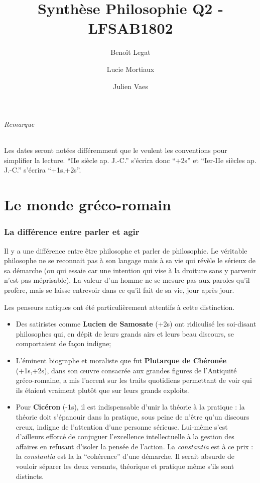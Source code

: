 \documentclass[11pt,a4paper]{article} %
\title{Synthèse Philosophie Q2 - LFSAB1802}
\author{Benoît Legat \and Lucie Mortiaux \and Julien Vaes}
\begin{document}
\maketitle

\paragraph{Remarque}
Les dates seront notées différemment que le veulent les conventions pour simplifier la lecture.
``IIe siècle ap. J.-C.'' s'écrira donc ``+2s'' et
``Ier-IIe siècles ap. J.-C.'' s'écrira ``+1s,+2s''.

\part{Le monde gréco-romain}

\section{La différence entre parler et agir}
Il y a une différence entre être philosophe et parler de philosophie.
Le véritable philosophe ne se reconnait pas à son langage mais à sa vie qui révèle le sérieux de sa démarche
(ou qui essaie car une intention qui vise à la droiture sans y parvenir n'est pas méprisable).
La valeur d'un homme ne se mesure pas aux paroles qu'il profère,
mais se laisse entrevoir dans ce qu'il fait de sa vie, jour après jour.

Les penseurs antiques ont été particulièrement attentifs à cette distinction.
\begin{itemize}
	\item Des satiristes comme \textbf{Lucien de Samosate} (+2s) ont ridiculisé les soi-disant philosophes qui,
		en dépit de leurs grands airs et leurs beau discours, se comportaient de façon indigne;
	\item L'éminent biographe et moraliste que fut \textbf{Plutarque de Chéronée} (+1s,+2s),
		dans son œuvre consacrée aux grandes figures de l'Antiquité gréco-romaine,
		a mis l'accent sur les traits quotidiens permettant de voir qui ils étaient vraiment plutôt que sur leurs grands exploits.
	\item Pour \textbf{Cicéron} (-1s), il est indispensable d'unir la théorie à la pratique :
		la théorie doit s'épanouir dans la pratique, sous peine de n'être qu'un discours
		creux, indigne de l'attention d'une personne sérieuse.
		Lui-même s'est d'ailleurs efforcé de
		conjuguer l'excellence intellectuelle à la gestion des affaires en refusant d'isoler la pensée
		de l'action. La \textit{constantia} est à ce prix : la \textit{constantia} est la
		la ``cohérence'' d'une démarche. Il serait absurde de vouloir séparer les deux versants, théorique et pratique
		même s'ils sont distincts.
\end{itemize}
\end{document}
